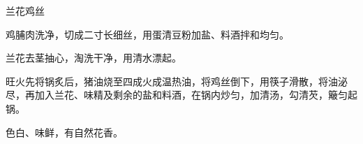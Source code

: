 \begin{recipe}{兰花鸡丝}

\ingredients


\preparation

\step 鸡脯肉洗净，切成二寸长细丝，用蛋清豆粉加盐、料酒拌和均匀。

\step 兰花去茎抽心，淘洗干净，用清水漂起。

\step 旺火先将锅炙后，猪油烧至四成火成温热油，将鸡丝倒下，用筷子滑散，将油泌
尽，再加入兰花、味精及剩余的盐和料酒，在锅内炒匀，加清汤，勾清芡，簸匀起锅。

\features

色白、味鲜，有自然花香。

\end{recipe}

